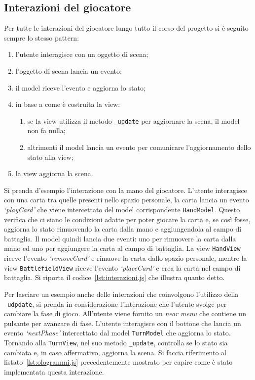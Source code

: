 \subsection{Interazioni del giocatore}
Per tutte le interazioni del giocatore lungo tutto il corso del progetto si è seguito sempre lo stesso pattern:
\begin{enumerate}
    \item l'utente interagisce con un oggetto di scena;
    \item l'oggetto di scena lancia un evento;
    \item il model riceve l'evento e aggiorna lo stato;
    \item in base a come è costruita la view:
    \begin{enumerate} 
        \item se la view utilizza il metodo \texttt{\_update} per aggiornare la scena, il model non fa nulla;
        \item altrimenti il model lancia un evento per comunicare l'aggiornamento dello stato alla view;
    \end{enumerate} 
    \item la view aggiorna la scena.
\end{enumerate} 
Si prenda d'esempio l'interazione con la mano del giocatore. L'utente interagisce con una carta tra quelle presenti nello spazio personale, la carta lancia un evento \textit{`playCard'}
che viene intercettato del model corrispondente \texttt{HandModel}. Questo verifica che ci siano le condizioni adatte per poter giocare la carta e, se così fosse, aggiorna lo stato
rimuovendo la carta dalla mano e aggiungendola al campo di battaglia. Il model quindi lancia due eventi: uno per rimuovere la carta dalla mano ed uno per aggiungere la carta al
campo di battaglia. La view \texttt{HandView} riceve l'evento \textit{`removeCard'} e rimuove la carta dallo spazio personale, mentre la view \texttt{BattlefieldView} riceve l'evento
\textit{`placeCard'} e crea la carta nel campo di battaglia. Si riporta il codice~\ref{lst:interazioni.js} che illustra quanto detto.

Per lasciare un esempio anche delle interazioni che coinvolgono l'utilizzo della \texttt{\_udpdate}, si prenda in considerazione l'interazione che l'utente svolge per cambiare la 
fase di gioco. All'utente viene fornito un \textit{near menu} che contiene un pulsante per avanzare di fase. L'utente interagisce con il bottone che lancia un evento 
\textit{`nextPhase'} intercettato dal model \texttt{TurnModel} che aggiorna lo stato. Tornando alla \texttt{TurnView}, nel suo metodo \texttt{\_update}, controlla se lo stato sia
cambiata e, in caso affermativo, aggiorna la scena. Si faccia riferimento al listato~\ref{lst:ologrammi.js} precedentemente mostrato per capire come è stato implementata questa
interazione.


